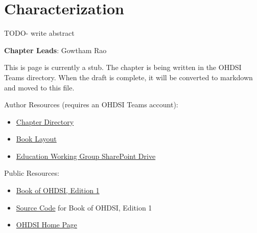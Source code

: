 \documentclass[
  letterpaper,
  paper=7in:10in,
  pagesize=pdftex,
  headinclude=on,
  footinclude=on,
  12pt]{scrbook}
\providecommand{\tightlist}{%
  \setlength{\itemsep}{0pt}\setlength{\parskip}{0pt}}\usepackage{longtable,booktabs,array}
\begin{document}
\chapter{Characterization}\label{sec-analytics-characterization}

TODO- write abstract

\hfill\break

\textbf{Chapter Leads}: Gowtham Rao

\begin{tcolorbox}[enhanced jigsaw, opacitybacktitle=0.6, coltitle=black, colback=white, bottomrule=.15mm, bottomtitle=1mm, title=\textcolor{quarto-callout-note-color}{\faInfo}\hspace{0.5em}{Note}, titlerule=0mm, rightrule=.15mm, colbacktitle=quarto-callout-note-color!10!white, colframe=quarto-callout-note-color-frame, toptitle=1mm, arc=.35mm, left=2mm, breakable, opacityback=0, leftrule=.75mm, toprule=.15mm]

This is page is currently a stub. The chapter is being written in the
OHDSI Teams directory. When the draft is complete, it will be converted
to markdown and moved to this file.

Author Resources (requires an OHDSI Teams account):

\begin{itemize}
\tightlist
\item
  \href{https://ohdsiorg.sharepoint.com/sites/Workgroup-EducationWorkingGroup/Shared\%20Documents/Forms/AllItems.aspx?id=\%2Fsites\%2FWorkgroup\%2DEducationWorkingGroup\%2FShared\%20Documents\%2FSection\%20III\%20\%2D\%20Analytics\%2FChapter\%2012\%20Characterization&viewid=05fec2cc\%2Dec8a\%2D4d04\%2Db565\%2Dcf1289b96f67}{Chapter
  Directory}
\item
  \href{https://ohdsiorg.sharepoint.com/:x:/r/sites/Workgroup-EducationWorkingGroup/_layouts/15/Doc2.aspx?action=edit&sourcedoc=\%7B1fa31e39-1c5f-4918-b878-609ebd9810b3\%7D&wdOrigin=TEAMS-WEB.teamsSdk_ns.rwc&wdExp=TEAMS-TREATMENT&wdhostclicktime=1748104477731&web=1}{Book
  Layout}
\item
  \href{https://ohdsiorg.sharepoint.com/sites/Workgroup-EducationWorkingGroup/Shared\%20Documents/Forms/AllItems.aspx?viewid=05fec2cc\%2Dec8a\%2D4d04\%2Db565\%2Dcf1289b96f67}{Education
  Working Group SharePoint Drive}
\end{itemize}

Public Resources:

\begin{itemize}
\tightlist
\item
  \href{https://ohdsi.github.io/TheBookOfOhdsi/}{Book of OHDSI, Edition
  1}
\item
  \href{https://github.com/OHDSI/TheBookOfOhdsi}{Source Code} for Book
  of OHDSI, Edition 1
\item
  \href{https://ohdsi.org/}{OHDSI Home Page}
\end{itemize}

\end{tcolorbox}
\end{document}
